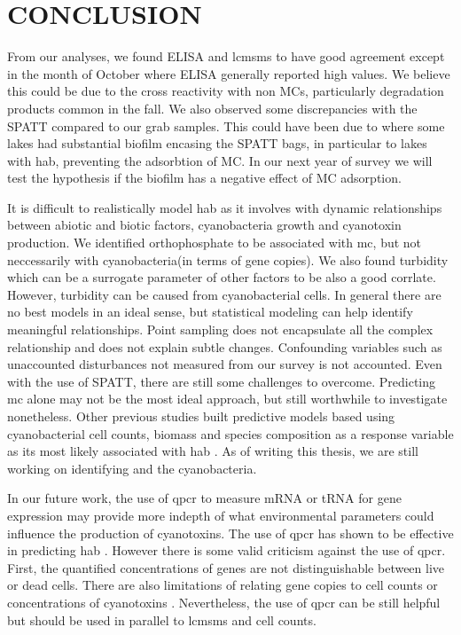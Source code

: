 \chapter{CONCLUSION}

From our analyses, we found ELISA and \gls{lcmsms} to have good agreement except in the month of October where ELISA generally reported high values. We believe this could be due to the cross reactivity with non MCs, particularly degradation products common in the fall. We also observed some discrepancies with the SPATT compared to our grab samples. This could have been due to where some lakes had substantial biofilm encasing the SPATT bags, in particular to lakes with \gls{hab}, preventing the adsorbtion of MC. In our next year of survey we will test the hypothesis if the biofilm has a negative effect of MC adsorption.

It is difficult to realistically model \gls{hab} as it involves with dynamic relationships between abiotic and biotic factors, cyanobacteria growth and cyanotoxin production. We identified orthophosphate to be associated with \gls{mc}, but not neccessarily with cyanobacteria(in terms of gene copies). We also found turbidity which can be a surrogate parameter of other factors to be also a good corrlate. However, turbidity can be caused from cyanobacterial cells. In general there are no best models in an ideal sense, but statistical modeling can help identify meaningful relationships. Point sampling does not encapsulate all the complex relationship and does not explain subtle changes. Confounding variables such as unaccounted disturbances not measured from our survey is not accounted. Even with the use of SPATT, there are still some challenges to overcome. Predicting \gls{mc} alone may not be the most ideal approach, but still worthwhile to investigate nonetheless. Other previous studies built predictive models based using cyanobacterial cell counts, biomass and species composition as a response variable as its most likely associated with \gls{hab} \cite{moore_richard_cyanobacterial_1993, ahn_evaluation_2011, jiang_statistical_2008, beaulieu_nutrients_2013, taranu_predicting_2017}. As of writing this thesis, we are still working on identifying and the cyanobacteria. 

In our future work, the use of \gls{qpcr} to measure mRNA or tRNA for gene expression may provide more indepth of what environmental parameters could influence the production of cyanotoxins. The use of \gls{qpcr} has shown to be effective in predicting \gls{hab} \cite{wilson_genetic_2005}. However there is some valid criticism against the use of \gls{qpcr}. First, the quantified concentrations of genes are not distinguishable between live or dead cells. There are also limitations of relating gene copies to cell counts or concentrations of cyanotoxins \cite{pacheco_is_2016}. Nevertheless, the use of \gls{qpcr} can be still helpful but should be used in parallel to \gls{lcmsms} and cell counts.

